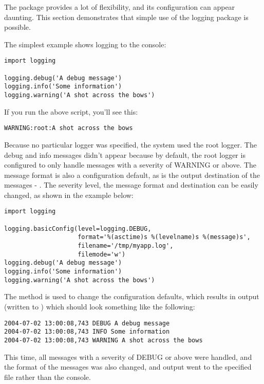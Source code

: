 The  package provides a lot of flexibility, and its
configuration can appear daunting.  This section demonstrates that simple
use of the logging package is possible.

The simplest example shows logging to the console:

\begin{verbatim}
import logging

logging.debug('A debug message')
logging.info('Some information')
logging.warning('A shot across the bows')
\end{verbatim}

If you run the above script, you'll see this:
\begin{verbatim}
WARNING:root:A shot across the bows
\end{verbatim}

Because no particular logger was specified, the system used the root logger.
The debug and info messages didn't appear because by default, the root
logger is configured to only handle messages with a severity of WARNING
or above. The message format is also a configuration default, as is the output
destination of the messages - . The severity level,
the message format and destination can be easily changed, as shown in
the example below:

\begin{verbatim}
import logging

logging.basicConfig(level=logging.DEBUG,
                    format='%(asctime)s %(levelname)s %(message)s',
                    filename='/tmp/myapp.log',
                    filemode='w')
logging.debug('A debug message')
logging.info('Some information')
logging.warning('A shot across the bows')
\end{verbatim}

The  method is used to change the configuration
defaults, which results in output (written to )
which should look something like the following:

\begin{verbatim}
2004-07-02 13:00:08,743 DEBUG A debug message
2004-07-02 13:00:08,743 INFO Some information
2004-07-02 13:00:08,743 WARNING A shot across the bows
\end{verbatim}

This time, all messages with a severity of DEBUG or above were handled,
and the format of the messages was also changed, and output went to the
specified file rather than the console.

